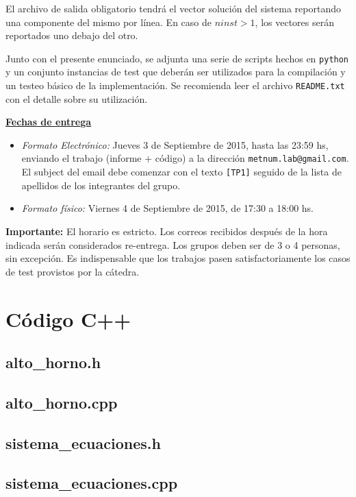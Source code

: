 El archivo de salida obligatorio tendr\'a el vector soluci\'on del sistema reportando una componente del mismo por
l\'inea. En caso de $ninst > 1$, los vectores ser\'an reportados uno debajo del otro.

Junto con el presente enunciado, se adjunta una serie de scripts hechos en \verb+python+ y un conjunto instancias de
test que deber\'an ser utilizados para la compilaci\'on y un testeo b\'asico de la implementaci\'on. Se recomienda leer
el archivo \verb+README.txt+ con el detalle sobre su utilizaci\'on.

{\bf \underline{Fechas de entrega}}
\begin{itemize}
\item \emph{Formato Electr\'onico:} Jueves 3 de Septiembre de 2015, hasta las 23:59 hs, enviando el trabajo (informe +
c\'odigo) a la direcci\'on \verb+metnum.lab@gmail.com+. El subject del email debe comenzar con el texto \verb+[TP1]+
seguido de la lista de apellidos de los integrantes del grupo.
\item \emph{Formato f\'isico:} Viernes 4 de Septiembre de 2015, de 17:30 a 18:00 hs.
\end{itemize}

\noindent \textbf{Importante:} El horario es estricto. Los correos recibidos despu\'es de la hora indicada ser\'an
considerados re-entrega. Los grupos deben ser de 3 o 4 personas, sin excepci\'on. Es indispensable que los trabajos
pasen satisfactoriamente los casos de test provistos por la c\'atedra.


\newpage
\section{Código C++} \label{sec:codigo}
\subsection{alto_horno.h}

\subsection{alto_horno.cpp}

\subsection{sistema_ecuaciones.h}

\subsection{sistema_ecuaciones.cpp}

